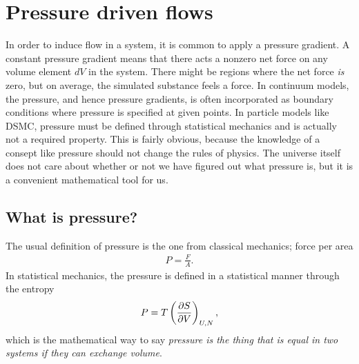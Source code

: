 \section{Pressure driven flows}
\label{sec:dsmc_pressure_driven_flows}
In order to induce flow in a system, it is common to apply a pressure gradient. A constant pressure gradient means that there acts a nonzero net force on any volume element $dV$ in the system. There might be regions where the net force \textit{is} zero, but on average, the simulated substance feels a force. In continuum models, the pressure, and hence pressure gradients, is often incorporated as boundary conditions where pressure is specified at given points. In particle models like DSMC, pressure must be defined through statistical mechanics and is actually not a required property. This is fairly obvious, because the knowledge of a consept like pressure should not change the rules of physics. The universe itself does not care about whether or not we have figured out what pressure is, but it is a convenient mathematical tool for us.

\subsection{What is pressure?}
The usual definition of pressure is the one from classical mechanics; force per area
\begin{align}
	P = \frac{F}{A}.
\end{align}
In statistical mechanics, the pressure is defined in a statistical manner through the entropy
\begin{align}
	P = T\left(\frac{\partial S}{\partial V}\right)_{U,N},
\end{align}
which is the mathematical way to say \textit{pressure is the thing that is equal in two systems if they can exchange volume}. 

